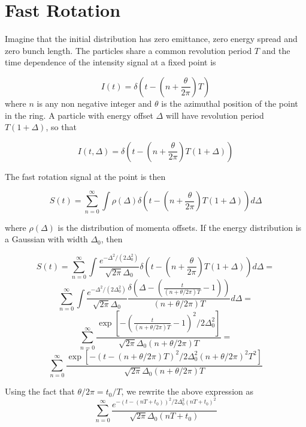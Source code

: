 \documentclass{article}
\begin{document}
\section{Fast Rotation}

Imagine that the initial distribution has zero emittance, zero energy spread and zero bunch length. The particles share a common revolution period $T$ and the time dependence of the intensity signal at a fixed point is 

\begin{equation}
I(t)=\delta\left(t-\left(n+\frac{\theta}{2\pi}\right)T\right)
\end{equation} 
where $n$ is any non negative integer and $\theta$ is the azimuthal position of the point in the ring. A particle with energy offset $\Delta$ will have revolution period $T(1+\Delta)$, so that 

\begin{equation}
I(t,\Delta)=\delta\left(t-\left(n+\frac{\theta}{2\pi}\right)T\left(1+\Delta\right)\right) 
\end{equation}

The fast rotation signal at the point is then 

\begin{equation}
S(t)=\sum^{\infty}_{n=0}\int\rho(\Delta)\delta\left(t-\left(n+\frac{\theta}{2\pi}\right)T\left(1+\Delta\right)\right)d\Delta 
\end{equation}

where $\rho(\Delta)$ is the distribution of momenta offsets. If the energy distribution is a Gaussian with width $\Delta_0$, then 

\[S(t) =\sum^{\infty}_{n=0}\int\frac{e^{-\Delta^2/(2\Delta^2_0)}}{\sqrt{2\pi}\Delta_0}\delta\left(t-\left(n+\frac{\theta}{2\pi}\right)T\left(1+\Delta\right)\right)d\Delta=\]\[\sum^{\infty}_{n=0}\int\frac{e^{-\Delta^2/(2\Delta^2_0)}}{\sqrt{2\pi}\Delta_0}\frac{\delta\left(\Delta-\left(\frac{t}{(n+\theta/2\pi)T}-1\right)\right)}{(n+\theta/2\pi)T}d\Delta=\]\[\sum^{\infty}_{n=0}\frac{\exp[-(\frac{t}{(n+\theta/2\pi)T}-1)^2/2\Delta^2_0]}{\sqrt{2\pi}\Delta_0(n+\theta/2\pi)T}=\]\[\sum^{\infty}_{n=0}\frac{\exp[-(t-(n+\theta/2\pi)T)^2/2\Delta^2_0(n+\theta/2\pi)^2T^2]}{\sqrt{2\pi}\Delta_0(n+\theta/2\pi)T}\]


Using the fact that $\theta/2\pi=t_0/T$, we rewrite the above expression as 
\begin{equation}
\sum^{\infty}_{n=0}\frac{e^{-(t-(nT+t_0))^2/2\Delta^2_0(nT+t_0)^2}}{\sqrt{2\pi}\Delta_0(nT+t_0)}
\end{equation}
\end{document}

